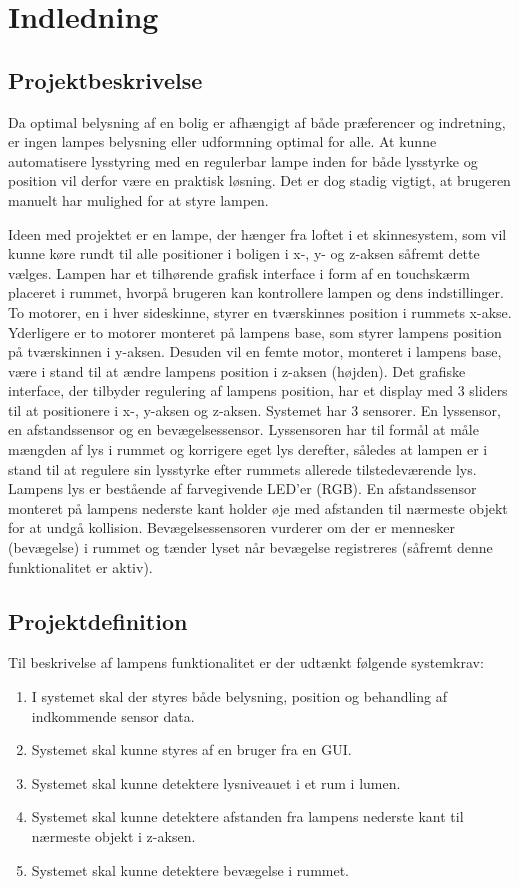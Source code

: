 \section{Indledning}

\subsection{Projektbeskrivelse}
Da optimal belysning af en bolig er afhængigt af både præferencer og indretning, er ingen lampes belysning eller udformning optimal for alle. At kunne automatisere lysstyring med en regulerbar lampe inden for både lysstyrke og position vil derfor være en praktisk løsning. Det er dog stadig vigtigt, at brugeren manuelt har mulighed for at styre lampen.

Ideen med projektet er en lampe, der hænger fra loftet i et skinnesystem, som vil kunne køre rundt til alle positioner i boligen i x-, y- og z-aksen såfremt dette vælges. Lampen har et tilhørende grafisk interface i form af en touchskærm placeret i rummet, hvorpå brugeren kan kontrollere lampen og dens indstillinger. To motorer, en i hver sideskinne, styrer en tværskinnes position i rummets x-akse. Yderligere er to motorer monteret på lampens base, som styrer lampens position på tværskinnen i y-aksen. Desuden vil en femte motor, monteret i lampens base, være i stand til at ændre lampens position i z-aksen (højden). Det grafiske interface, der tilbyder regulering af lampens position, har et display med 3 sliders til at positionere i x-, y-aksen og z-aksen.
Systemet har 3 sensorer. En lyssensor, en afstandssensor og en bevægelsessensor. Lyssensoren har til formål at måle mængden af lys i rummet og korrigere eget lys derefter, således at lampen er i stand til at regulere sin lysstyrke efter rummets allerede tilstedeværende lys. Lampens lys er bestående af farvegivende LED’er (RGB). En afstandssensor monteret på lampens nederste kant holder øje med afstanden til nærmeste objekt for at undgå kollision. Bevægelsessensoren vurderer om der er mennesker (bevægelse) i rummet og tænder lyset når bevægelse registreres (såfremt denne funktionalitet er aktiv).

\subsection{Projektdefinition}
Til beskrivelse af lampens funktionalitet er der udtænkt følgende systemkrav:
\begin{enumerate}
    \item I systemet skal der styres både belysning, position og behandling af indkommende sensor data. 
    \item Systemet skal kunne styres af en bruger fra en GUI.
    \item Systemet skal kunne detektere lysniveauet i et rum i lumen.
    \item Systemet skal kunne detektere afstanden fra lampens nederste kant til nærmeste objekt i z-aksen.
    \item Systemet skal kunne detektere bevægelse i rummet.
\end{enumerate}

